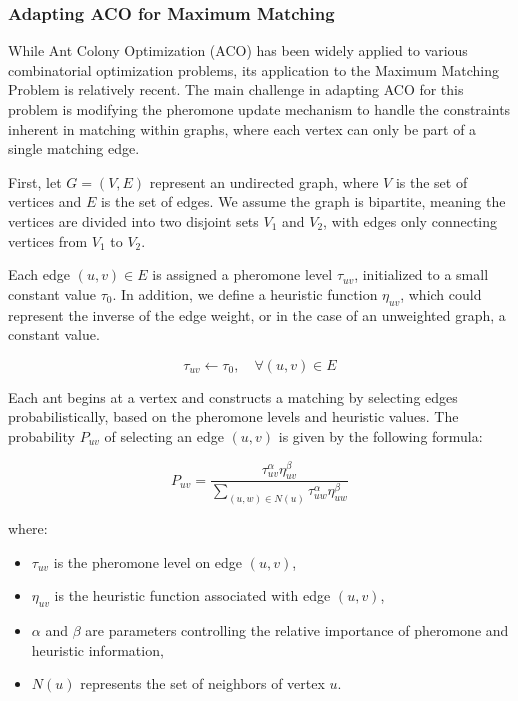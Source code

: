 \subsubsection*{Adapting ACO for Maximum Matching}

While Ant Colony Optimization (ACO) has been widely applied to various combinatorial optimization problems, its application to the Maximum Matching Problem is relatively recent. The main challenge in adapting ACO for this problem is modifying the pheromone update mechanism to handle the constraints inherent in matching within graphs, where each vertex can only be part of a single matching edge. 

First, let \( G = (V, E) \) represent an undirected graph, where \( V \) is the set of vertices and \( E \) is the set of edges. We assume the graph is bipartite, meaning the vertices are divided into two disjoint sets \( V_1 \) and \( V_2 \), with edges only connecting vertices from \( V_1 \) to \( V_2 \).

Each edge \( (u, v) \in E \) is assigned a pheromone level \( \tau_{uv} \), initialized to a small constant value \( \tau_0 \). In addition, we define a heuristic function \( \eta_{uv} \), which could represent the inverse of the edge weight, or in the case of an unweighted graph, a constant value.

\[
\tau_{uv} \leftarrow \tau_0, \quad \forall (u, v) \in E
\]

Each ant begins at a vertex and constructs a matching by selecting edges probabilistically, based on the pheromone levels and heuristic values. The probability \( P_{uv} \) of selecting an edge \( (u, v) \) is given by the following formula:

\[
P_{uv} = \frac{\tau_{uv}^\alpha \eta_{uv}^\beta}{\sum_{(u, w) \in N(u)} \tau_{uw}^\alpha \eta_{uw}^\beta}
\]

where:
\begin{itemize}
    \item \( \tau_{uv} \) is the pheromone level on edge \( (u, v) \),
    \item \( \eta_{uv} \) is the heuristic function associated with edge \( (u, v) \),
    \item \( \alpha \) and \( \beta \) are parameters controlling the relative importance of pheromone and heuristic information,
    \item \( N(u) \) represents the set of neighbors of vertex \( u \).
\end{itemize}

